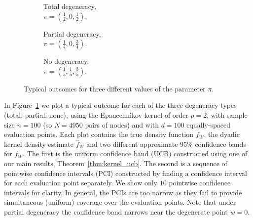 \documentclass[11pt,lof]{puthesis}
\theoremstyle{break}
\theoremstyle{proof}
\begin{document}
\begin{figure}[b!]
  \centering
  \begin{subfigure}{0.32\textwidth}
    \centering
    \caption{Total degeneracy, \\
    $\pi = \left( \frac{1}{2}, 0, \frac{1}{2} \right)$.}
  \end{subfigure}
  \begin{subfigure}{0.32\textwidth}
    \centering
    \caption{Partial degeneracy, \\
    $\pi = \left( \frac{1}{4}, 0, \frac{3}{4} \right)$.}
  \end{subfigure}
  \begin{subfigure}{0.32\textwidth}
    \centering
    \caption{No degeneracy, \\
    $\pi = \left( \frac{1}{5}, \frac{1}{5}, \frac{3}{5} \right)$.}
  \end{subfigure}
  \caption[Typical outcomes for different values of the parameter $\pi$]
  {Typical outcomes for three different values of the parameter $\pi$.}
  \label{fig:kernel_results}
\end{figure}

In Figure~\ref{fig:kernel_results} we plot a typical outcome for each of the
three degeneracy types (total, partial, none), using the Epanechnikov kernel of
order $p=2$, with sample size $n=100$ (so $N=4950$ pairs of nodes) and with
$d=100$ equally-spaced evaluation points. Each plot contains the true density
function $f_W$, the dyadic kernel density estimate $\hat f_W$ and two different
approximate $95\%$ confidence bands for $f_W$. The first is the uniform
confidence band (UCB) constructed using one of our main results,
Theorem~\ref{thm:kernel_ucb}. The second is a sequence of pointwise confidence
intervals (PCI) constructed by finding a confidence interval for each evaluation
point separately. We show only $10$ pointwise confidence intervals for clarity.
In general, the PCIs are too narrow as they fail to provide simultaneous
(uniform) coverage over the evaluation points. Note that under partial
degeneracy the confidence band narrows near the degenerate point $w = 0$.
\end{document}
